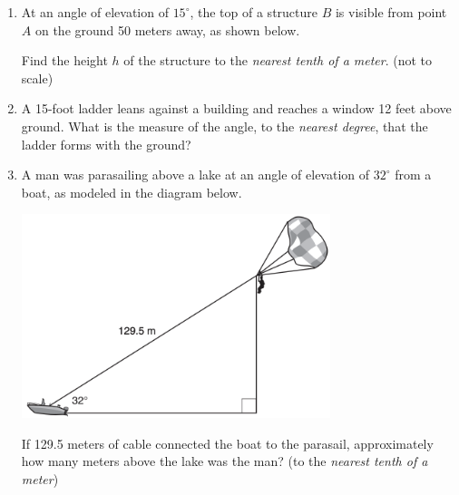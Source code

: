 \documentclass[12pt, twoside]{article}
\begin{document}
\begin{enumerate}
\newpage
\item At an angle of elevation of $15^\circ$, the top of a structure $B$ is visible from point $A$ on the ground 50 meters away, as shown below.

Find the height $h$ of the structure to the \emph{nearest tenth of a meter}. \hfill (not to scale)
  \begin{flushright}
    \end{flushright} \vspace{3cm}


\item A 15-foot ladder leans against a building and reaches a window 12 feet above ground. What is the measure of the angle, to the \emph{nearest degree}, that the ladder forms with the ground?

\item A man was parasailing above a lake at an angle of elevation of $32^\circ$ from a boat, as modeled in the diagram below.
  \begin{center}
    \includegraphics[width=9cm]{../graphics/parasail.png}
  \end{center}
If 129.5 meters of cable connected the boat to the parasail, approximately how many meters above the lake was the man? (to the \emph{nearest tenth of a meter})


\end{enumerate}
\end{document}
